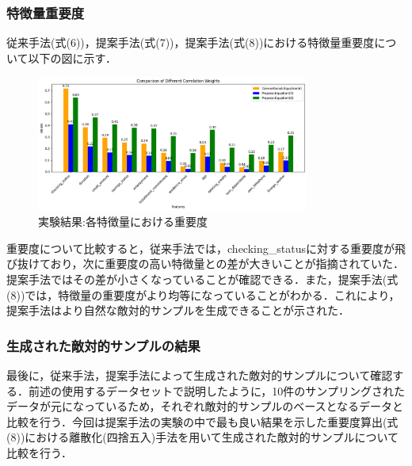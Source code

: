 \subsubsection{特徴量重要度}
従来手法(式(6))，提案手法(式(7))，提案手法(式(8))における特徴量重要度について以下の図に示す．
\begin{figure}[H]
    \centering
    \includegraphics[width=0.8\textwidth]{images/実験_重要度算出の結果.png}
    \caption{実験結果:各特徴量における重要度}
    \label{fig:adversarial_example}
\end{figure}
重要度について比較すると，従来手法では，checking\_statusに対する重要度が飛び抜けており，次に重要度の高い特徴量との差が大きいことが指摘されていた．提案手法ではその差が小さくなっていることが確認できる．また，提案手法(式(8))では，特徴量の重要度がより均等になっていることがわかる．これにより，提案手法はより自然な敵対的サンプルを生成できることが示された．

\subsubsection{生成された敵対的サンプルの結果}
最後に，従来手法，提案手法によって生成された敵対的サンプルについて確認する．前述の使用するデータセットで説明したように，10件のサンプリングされたデータが元になっているため，それぞれ敵対的サンプルのベースとなるデータと比較を行う．今回は提案手法の実験の中で最も良い結果を示した重要度算出(式(8))における離散化(四捨五入)手法を用いて生成された敵対的サンプルについて比較を行う．

